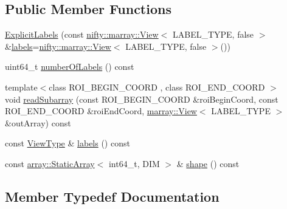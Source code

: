 \subsection*{Public Member Functions}
\begin{DoxyCompactItemize}
\item 
\hyperlink{classnifty_1_1graph_1_1ExplicitLabels_ae503c70604d75e48d73622f8941cfa34}{Explicit\+Labels} (const \hyperlink{classandres_1_1View}{nifty\+::marray\+::\+View}$<$ L\+A\+B\+E\+L\+\_\+\+T\+Y\+PE, false $>$ \&\hyperlink{classnifty_1_1graph_1_1ExplicitLabels_a8ca813486933212330c6053129cb4758}{labels}=\hyperlink{classandres_1_1View}{nifty\+::marray\+::\+View}$<$ L\+A\+B\+E\+L\+\_\+\+T\+Y\+PE, false $>$())
\item 
uint64\+\_\+t \hyperlink{classnifty_1_1graph_1_1ExplicitLabels_ab34ace7ac75307c3ae7e1ffc70e4e9eb}{number\+Of\+Labels} () const
\item 
{\footnotesize template$<$class R\+O\+I\+\_\+\+B\+E\+G\+I\+N\+\_\+\+C\+O\+O\+RD , class R\+O\+I\+\_\+\+E\+N\+D\+\_\+\+C\+O\+O\+RD $>$ }\\void \hyperlink{classnifty_1_1graph_1_1ExplicitLabels_a8b3717b94ebe54a2d74f973792984e27}{read\+Subarray} (const R\+O\+I\+\_\+\+B\+E\+G\+I\+N\+\_\+\+C\+O\+O\+RD \&roi\+Begin\+Coord, const R\+O\+I\+\_\+\+E\+N\+D\+\_\+\+C\+O\+O\+RD \&roi\+End\+Coord, \hyperlink{classandres_1_1View}{marray\+::\+View}$<$ L\+A\+B\+E\+L\+\_\+\+T\+Y\+PE $>$ \&out\+Array) const
\item 
const \hyperlink{classnifty_1_1graph_1_1ExplicitLabels_aaab98314403b95503bf0c32e65fd1884}{View\+Type} \& \hyperlink{classnifty_1_1graph_1_1ExplicitLabels_a8ca813486933212330c6053129cb4758}{labels} () const
\item 
const \hyperlink{namespacenifty_1_1array_a683f151f19c851754e0c6d55ed16a0c2}{array\+::\+Static\+Array}$<$ int64\+\_\+t, D\+IM $>$ \& \hyperlink{classnifty_1_1graph_1_1ExplicitLabels_a84a51a06ef2d9609a6737662e51b8984}{shape} () const
\end{DoxyCompactItemize}


\subsection{Member Typedef Documentation}
\mbox{\label{classnifty_1_1graph_1_1ExplicitLabels_a896653b58048ec52d8e00800279d9b53}} 
